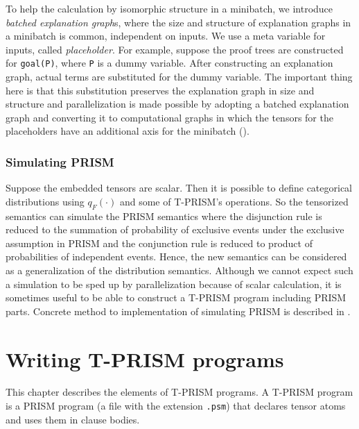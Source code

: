 \documentclass[a4paper]{report}
\begin{document}
To help  the calculation  by isomorphic structure  in a  minibatch, we
introduce  {\em  batched explanation  graph\/}s,  where  the size  and
structure of explanation graphs in  a minibatch is common, independent
on  inputs.   We  use  a   meta  variable  for  inputs,   called  {\em
	placeholder}.  For  example, suppose  the proof trees  are constructed
for  {\tt  goal(P)},  where  {\tt  P}  is  a  dummy  variable.   After
constructing an  explanation graph,  actual terms are  substituted for
the dummy variable. The important thing here is that this substitution
preserves   the  explanation   graph   in  size   and  structure   and
parallelization  is made  possible by  adopting a  batched explanation
graph and converting it to computational graphs in which the tensors
for the placeholders have an additional axis for the minibatch
().

\subsection*{Simulating PRISM}

Suppose the embedded tensors are scalar. Then it is possible to define
categorical  distributions using  $q_F(\cdot)$ and  some of  T-PRISM's
operations.   So  the  tensorized  semantics can  simulate  the  PRISM
semantics where  the disjunction rule  is reduced to the  summation of
probability  of exclusive  events  under the  exclusive assumption  in
PRISM \cite{Sato08a} and the conjunction rule is reduced to product of
probabilities of independent events.
Hence, the new semantics can be  considered as a generalization of the
distribution semantics. Although we cannot expect such a simulation to
be sped  up by  parallelization because of  scalar calculation,  it is
sometimes useful  to be able to construct a  T-PRISM program including
PRISM parts.
Concrete method to implementation of simulating PRISM is described in .

\chapter{Writing T-PRISM programs}
\label{chap:language}

This chapter describes the elements of T-PRISM programs.  A T-PRISM
program is a PRISM program (a file with the extension {\tt .psm}) that
declares tensor atoms and uses them in clause bodies.
\end{document}
